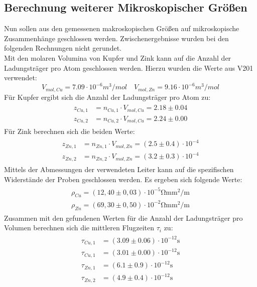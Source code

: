\subsection{Berechnung weiterer Mikroskopischer Größen}
Nun sollen aus den gemessenen makroskopischen Größen auf mikroskopische Zusammenhänge geschlossen werden. Zwischenergebnisse
wurden bei den folgenden Rechnungen nicht gerundet. \\
Mit den molaren Volumina von Kupfer und Zink kann auf die Anzahl der Ladungsträger pro Atom
geschlossen werden. Hierzu wurden die Werte aus V201 verwendet:
\begin{equation}
  V_{mol, Cu} = 7.09 \cdot 10^{-6} \si{m^3 /mol} \quad   V_{mol, Zn} = 9.16 \cdot 10^{-6} \si{m^3 /mol}
\end{equation}
Für Kupfer ergibt sich die Anzahl der Ladungsträger pro Atom zu:
\begin{align}
  \begin{aligned}
    z_{Cu,1} &= n_{Cu,1} \cdot V_{mol, Cu} =  2.18 \pm 0.04  \\
    z_{Cu,2} &= n_{Cu,2} \cdot V_{mol, Cu} =  2.24 \pm 0.00
  \end{aligned}
\end{align}
Für Zink berechnen sich die beiden Werte:
\begin{align}
  \begin{aligned}
    z_{Zn,1} &= n_{Zn,1} \cdot V_{mol, Zn} =  (2.5\pm 0.4)\cdot 10^{-4}\\
    z_{Zn,2} &= n_{Zn,2} \cdot V_{mol, Zn} =   (3.2\pm 0.3)\cdot 10^{-4}
  \end{aligned}
\end{align}
Mittels der Abmessungen der verwendeten Leiter kann auf die spezifischen Widerstände der Proben geschlossen werden. Es ergeben sich folgende Werte:
\begin{align}
  \begin{aligned}
    \rho_{Cu} =  (12,40 \pm 0,03)\cdot 10^{-5} \si{\ohm \milli \meter^2 \per \meter} \\
    \rho_{Zn} =  (69,30 \pm 0,50) \cdot 10^{-2} \si{\ohm \milli \meter^2 \per \meter}
  \end{aligned}
\end{align}
Zusammen mit den gefundenen Werten für die Anzahl der Ladungsträger pro Volumen berechnen sich die mittleren Flugzeiten $\tau_i$ zu:
\begin{align}
  \begin{aligned}
    \tau_{Cu,1} &= (3.09 \pm 0.06) \cdot 10^{-12} \si{\second} \\
    \tau_{Cu,1} &= (3.01 \pm 0.00) \cdot 10^{-12} \si{\second} \\
    \tau_{Zn,1} &= (6.1 \pm 0.9) \cdot 10^{-12} \si{\second} \\
    \tau_{Zn,2} &= (4.9 \pm 0.4) \cdot 10^{-12} \si{\second}
  \end{aligned}
\end{align}
